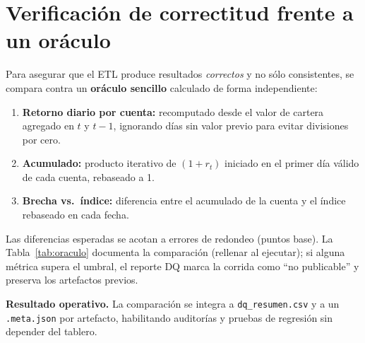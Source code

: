 \documentclass[conference]{IEEEtran}
\begin{document}
\section{Verificación de correctitud frente a un oráculo}
Para asegurar que el ETL produce resultados \emph{correctos} y no sólo consistentes, se compara contra un \textbf{oráculo sencillo} calculado de forma independiente:
\begin{enumerate}
    \item \textbf{Retorno diario por cuenta:} recomputado desde el valor de cartera agregado en $t$ y $t-1$, ignorando días sin valor previo para evitar divisiones por cero.
    \item \textbf{Acumulado:} producto iterativo de $(1+r_t)$ iniciado en el primer día válido de cada cuenta, rebaseado a 1.
    \item \textbf{Brecha vs.\ índice:} diferencia entre el acumulado de la cuenta y el índice rebaseado en cada fecha.
\end{enumerate}
Las diferencias esperadas se acotan a errores de redondeo (puntos base). La Tabla~\ref{tab:oraculo} documenta la comparación (rellenar al ejecutar); si alguna métrica supera el umbral, el reporte DQ marca la corrida como “no publicable” y preserva los artefactos previos.

\begin{table}[!t]
\centering
\caption{Comparación ETL vs.\ oráculo (calculado sobre artefactos Parquet)}
\label{tab:oraculo}
\vspace{-2mm}
\end{table}

\noindent\textbf{Resultado operativo.} La comparación se integra a \texttt{dq\_resumen.csv} y a un \texttt{.meta.json} por artefacto, habilitando auditorías y pruebas de regresión sin depender del tablero.
\end{document}

